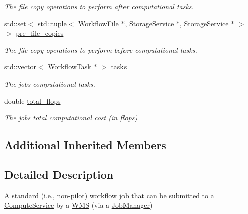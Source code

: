 \begin{DoxyCompactItemize}
\begin{DoxyCompactList}\small\item\em The file copy operations to perform after computational tasks. \end{DoxyCompactList}\item 
\mbox{\label{classwrench_1_1_standard_job_ad51c7c980f194968dbee7e99043ed795}} 
std\+::set$<$ std\+::tuple$<$ \hyperlink{classwrench_1_1_workflow_file}{Workflow\+File} $\ast$, \hyperlink{classwrench_1_1_storage_service}{Storage\+Service} $\ast$, \hyperlink{classwrench_1_1_storage_service}{Storage\+Service} $\ast$ $>$ $>$ \hyperlink{classwrench_1_1_standard_job_ad51c7c980f194968dbee7e99043ed795}{pre\+\_\+file\+\_\+copies}
\begin{DoxyCompactList}\small\item\em The file copy operations to perform before computational tasks. \end{DoxyCompactList}\item 
\mbox{\label{classwrench_1_1_standard_job_a5e5952459506f8cd52cc611ea8e4505a}} 
std\+::vector$<$ \hyperlink{classwrench_1_1_workflow_task}{Workflow\+Task} $\ast$ $>$ \hyperlink{classwrench_1_1_standard_job_a5e5952459506f8cd52cc611ea8e4505a}{tasks}
\begin{DoxyCompactList}\small\item\em The job\textquotesingle{}s computational tasks. \end{DoxyCompactList}\item 
\mbox{\label{classwrench_1_1_standard_job_a828c40483b8d94cfbedf09bddddc31be}} 
double \hyperlink{classwrench_1_1_standard_job_a828c40483b8d94cfbedf09bddddc31be}{total\+\_\+flops}
\begin{DoxyCompactList}\small\item\em The job\textquotesingle{}s total computational cost (in flops) \end{DoxyCompactList}\end{DoxyCompactItemize}
\subsection*{Additional Inherited Members}


\subsection{Detailed Description}
A standard (i.\+e., non-\/pilot) workflow job that can be submitted to a \hyperlink{classwrench_1_1_compute_service}{Compute\+Service} by a \hyperlink{classwrench_1_1_w_m_s}{W\+MS} (via a \hyperlink{classwrench_1_1_job_manager}{Job\+Manager}) 

